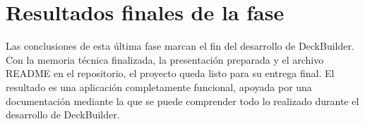 \section{Resultados finales de la fase}

Las conclusiones de esta última fase marcan el fin del desarrollo de DeckBuilder. Con la memoria técnica finalizada, la presentación preparada y el archivo README en el repositorio, el proyecto queda listo para su entrega final. El resultado es una aplicación completamente funcional, apoyada por una documentación mediante la que se puede comprender todo lo realizado durante el desarrollo de DeckBuilder.

